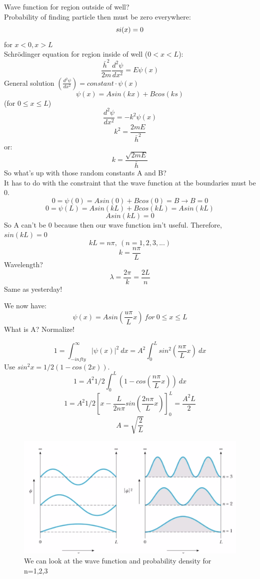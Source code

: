 \documentclass[class=article,crop=false]{standalone}
\begin{document}
Wave function for region outside of well?\\
Probability of finding particle then must be zero everywhere:
$$\\si(x) = 0 $$ for $x < 0, x > L$\\

Schrödinger equation for region inside of well ($0 < x < L$):
$$ \frac{\bar{h}^2}{2m} \frac{d^2\psi}{dx^2} = E\psi(x) $$
General solution $\left( \frac{d^2\psi}{dx^2} \right) = constant \cdot \psi(x) $\\
$$ \psi(x) = A sin(kx) + Bcos(ks) $$
(for $0 \leq x \leq L$)
$$ \frac{d^2\psi}{dx^2} = -k^2 \psi(x) $$
$$ k^2 = \frac{2mE}{\bar{h}^2} $$
or:
$$ k = \frac{\sqrt{2mE}}{\bar{h}} $$
So what's up with those random constants A and B?\\
It has to do with the constraint that the wave function at the boundaries must be 0.
$$ 0 = \psi(0) = A sin(0) + B cos(0) = B \rightarrow B = 0 $$
$$ 0 = \psi(L) = A sin(kL) + B cos(kL) = A sin(kL) $$
$$ A sin(kL) = 0 $$
So A can't be 0 because then our wave function isn't useful. Therefore, $sin(kL) = 0$\\
$$kL = n\pi,\ (n=1,2,3,...) $$
$$ k = \frac{n\pi}{L} $$
Wavelength?
$$ \lambda = \frac{2\pi}{k} = \frac{2L}{n} $$
Same as yesterday! \\
\skip

We now have:
$$ \psi(x) = A sin\left(\frac{u\pi}{L} x\right)\ for\ 0 \leq x \leq L $$
What is A? Normalize!

$$ 1 = \int_{-infty}^\infty |\psi(x)|^2\ dx = A^2 \int_0^L sin^2\left(\frac{n\pi}{L} x\right)\ dx $$
Use $sin^2x = 1/2 (1-cos(2x))$.
$$ 1 = A^2 1/2 \int_0^L (1-cos\left(\frac{n\pi}{L} x\right))\ dx $$
$$ 1 = A^2 1/2 \left[x - \frac{L}{2n\pi} sin\left(\frac{2n\pi}{L} x\right)\right]^L_0 = \frac{A^2L}{2} $$
$$ A = \sqrt{\frac{2}{L}} $$

\begin{figure}[h!]
	\centering
	\includegraphics[width=.7\linewidth]{./Images/probability_or_function.png}
	\caption{We can look at the wave function and probability density for n=1,2,3}
\end{figure}
\end{document}
